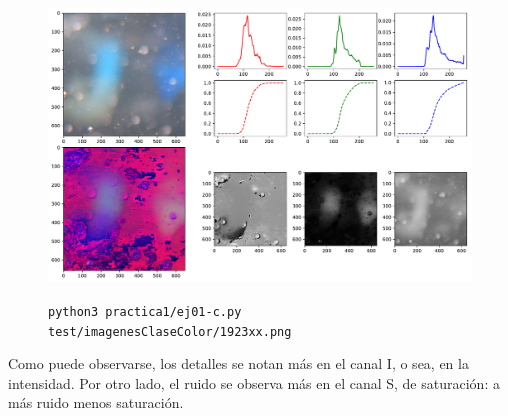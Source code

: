 \documentclass[11pt, spanish]{article}
\begin{document}
\begin{figure}[H]
\centering
  \includegraphics[height=8cm]{informe-imgs/ej04-3.pdf}
  \caption{\texttt{python3 practica1/ej01-c.py test/imagenesClaseColor/1923xx.png}}
\end{figure}

Como puede observarse, los detalles se notan más en el canal I, o sea, en la intensidad.
Por otro lado, el ruido se observa más en el canal S, de saturación: a más ruido menos saturación.
\end{document}
